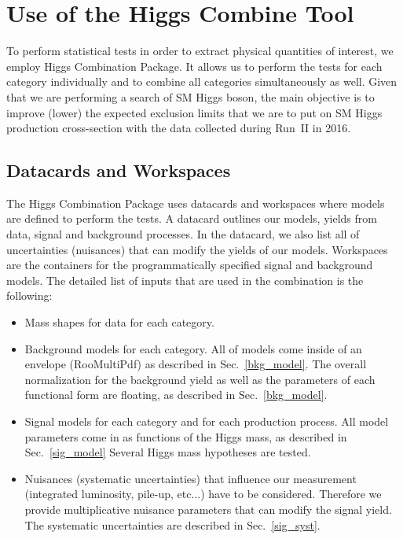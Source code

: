 \section{Use of the Higgs Combine Tool}
\label{combine_tool}

%
%

To perform statistical tests in order to extract physical quantities of
interest, we employ Higgs Combination Package. It allows us to perform the
tests for each category individually and to combine all categories
simultaneously as well. Given that we are performing a search of SM Higgs
boson, the main objective is to improve (lower) the expected exclusion limits
that we are to put on SM Higgs production cross-section with the data
collected during Run~II in 2016.

\subsection{Datacards and Workspaces}
The Higgs Combination Package uses datacards and workspaces where models
are defined to perform the tests. A datacard outlines our models, yields
from data, signal and background processes. In the datacard, we also list all
of uncertainties (nuisances) that can modify the yields of our models.
Workspaces are the containers for the programmatically specified signal and
background models. The detailed list of inputs that are used in the combination
 is the following:

\begin{itemize}
    \item Mass shapes for data for each category.
    \item Background models for each category. All of models come inside of
an envelope (RooMultiPdf) as described in Sec.~\ref{bkg_model}. The overall
normalization for the background yield as well as the parameters of each
functional form are floating, as described in Sec.~\ref{bkg_model}.  %
    \item Signal models for each category and for each production process. All
model parameters come in as functions of the Higgs mass, as described in
Sec.~\ref{sig_model} %
Several Higgs mass hypotheses are tested.
    \item Nuisances (systematic uncertainties) that influence our
measurement (integrated luminosity, pile-up, etc...) have to be considered.
Therefore we provide multiplicative nuisance parameters that can modify the
signal yield. The systematic uncertainties are described in Sec.~\ref{sig_syst}.
\end{itemize}

